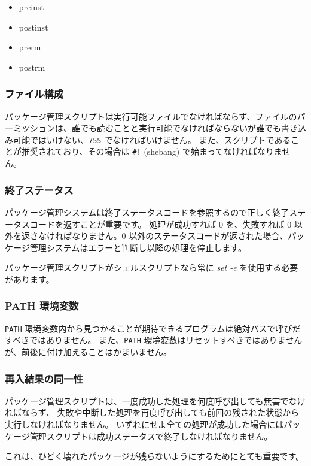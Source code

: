 \documentclass[mingoth,a4paper]{jsarticle}
\begin{document}
\begin{itemize}
\item preinst
\item postinst
\item prerm
\item postrm
\end{itemize}



\subsubsection{ファイル構成}
パッケージ管理スクリプトは実行可能ファイルでなければならず、ファイルのパーミッションは、誰でも読むことと実行可能でなければならないが誰でも書き込み可能ではいけない、{\tt 755} でなければいけません。
また、スクリプトであることが推奨されており、その場合は {\tt \#!} (shebang) で始まってなければなりません。

\subsubsection{終了ステータス}
パッケージ管理システムは終了ステータスコードを参照するので正しく終了ステータスコードを返すことが重要です。
処理が成功すれば 0 を、失敗すれば 0 以外を返さなければなりません。0 以外のステータスコードが返された場合、パッケージ管理システムはエラーと判断し以降の処理を停止します。

パッケージ管理スクリプトがシェルスクリプトなら常に {\it set -e} を使用する必要があります。

\subsubsection{PATH 環境変数}
{\tt PATH} 環境変数内から見つかることが期待できるプログラムは絶対パスで呼びだすべきではありません。
また、{\tt PATH} 環境変数はリセットすべきではありませんが、前後に付け加えることはかまいません。

\subsubsection{再入結果の同一性}
パッケージ管理スクリプトは、一度成功した処理を何度呼び出しても無害でなければならず、
失敗や中断した処理を再度呼び出しても前回の残された状態から実行しなければなりません。
いずれにせよ全ての処理が成功した場合にはパッケージ管理スクリプトは成功ステータスで終了しなければなりません。

これは、ひどく壊れたパッケージが残らないようにするためにとても重要です。
\end{document}
